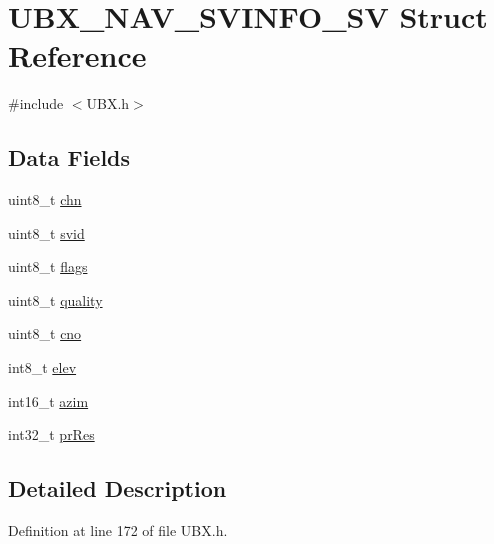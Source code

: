 \hypertarget{struct_u_b_x___n_a_v___s_v_i_n_f_o___s_v}{\section{\-U\-B\-X\-\_\-\-N\-A\-V\-\_\-\-S\-V\-I\-N\-F\-O\-\_\-\-S\-V \-Struct \-Reference}
\label{struct_u_b_x___n_a_v___s_v_i_n_f_o___s_v}
}


{\ttfamily \#include $<$\-U\-B\-X.\-h$>$}

\subsection*{\-Data \-Fields}
\begin{DoxyCompactItemize}
\item 
uint8\-\_\-t \hyperlink{struct_u_b_x___n_a_v___s_v_i_n_f_o___s_v_a51b387f250ae37f8d3fa45cdd6adca45}{chn}
\item 
uint8\-\_\-t \hyperlink{struct_u_b_x___n_a_v___s_v_i_n_f_o___s_v_a95b2c35d609942ecc9257b9d1c1df03d}{svid}
\item 
uint8\-\_\-t \hyperlink{struct_u_b_x___n_a_v___s_v_i_n_f_o___s_v_ae645c4ae01edd4d7c5dffca7eb094aa3}{flags}
\item 
uint8\-\_\-t \hyperlink{struct_u_b_x___n_a_v___s_v_i_n_f_o___s_v_a3d99d4c098bc0ba52408def4080330c5}{quality}
\item 
uint8\-\_\-t \hyperlink{struct_u_b_x___n_a_v___s_v_i_n_f_o___s_v_a05f735590e6c4aaa53746a4756695b09}{cno}
\item 
int8\-\_\-t \hyperlink{struct_u_b_x___n_a_v___s_v_i_n_f_o___s_v_a8fad57e044674c92508262141a99a154}{elev}
\item 
int16\-\_\-t \hyperlink{struct_u_b_x___n_a_v___s_v_i_n_f_o___s_v_a74c4856a9ce3011e1de4fb51a80062dc}{azim}
\item 
int32\-\_\-t \hyperlink{struct_u_b_x___n_a_v___s_v_i_n_f_o___s_v_adf2342e560319acf1b48051a49463b09}{pr\-Res}
\end{DoxyCompactItemize}


\subsection{\-Detailed \-Description}


\-Definition at line 172 of file \-U\-B\-X.\-h.



